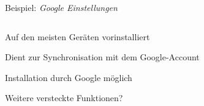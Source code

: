\begin{frame}
	\centering
	Beispiel: \textit{Google Einstellungen}
	\begin{columns}[T] %
    	\begin{column}[T]{5cm} %
    		\begin{block}{}
				Auf den meisten Geräten vorinstalliert
			\end{block}
			\begin{block}{}
				Dient zur Synchronisation mit dem Google-Account
			\end{block}
			\begin{block}{}
				Installation durch Google möglich
			\end{block}
			\begin{block}{}
				Weitere versteckte Funktionen?
			\end{block}
    	\end{column}
	\end{columns}

\end{frame}